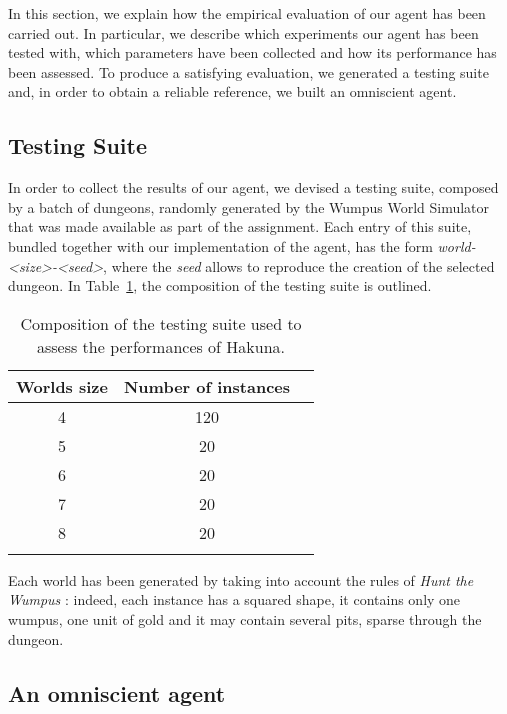 \documentclass{llncs}
\newcommand{\htw}{\emph{Hunt the Wumpus }}
\begin{document}
In this section, we explain how the empirical evaluation of our agent has been carried out.
In particular, we describe which experiments our agent has been tested with, which parameters have been collected and how its performance has been assessed.
To produce a satisfying evaluation, we generated a testing suite and, in order to obtain a reliable reference, we built an omniscient agent.

\subsection{Testing Suite}

In order to collect the results of our agent, we devised a testing suite, composed by a batch of dungeons, randomly generated by the Wumpus World Simulator that was made available as part of the assignment.
Each entry of this suite, bundled together with our implementation of the agent, has the form \emph{world-<size>-<seed>}, where the \emph{seed} allows to reproduce the creation of the selected dungeon.
In Table~\ref{tbl:test}, the composition of the testing suite is outlined.

\begin{table}[t]
	\label{tbl:test}
	\centering
	\begin{tabular}{ccc}
	\toprule
	Worlds size & Number of instances \\
	\midrule
	4 & 120 \\
	5 &  20 \\
	6 &  20 \\
	7 &  20 \\
	8 &  20 \\
	\bottomrule\\
	\end{tabular}
	\caption{Composition of the testing suite used to assess the performances of Hakuna.}
\end{table}

Each world has been generated by taking into account the rules of \htw: indeed, each instance has a squared shape, it contains only one wumpus, one unit of gold and it may contain several pits, sparse through the dungeon.


\subsection{An omniscient agent}
\end{document}
